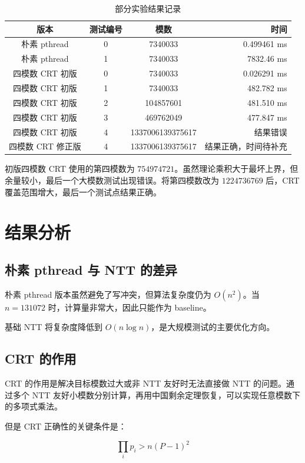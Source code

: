 \documentclass[UTF8,a4paper,12pt]{ctexart}
\begin{document}
\begin{table}[h]
\centering
\begin{tabular}{cccr}
\toprule
版本 & 测试编号 & 模数 & 时间 \\
\midrule
朴素 pthread & 0 & 7340033 & 0.499461 ms \\
朴素 pthread & 1 & 7340033 & 7832.46 ms \\
四模数 CRT 初版 & 0 & 7340033 & 0.026291 ms \\
四模数 CRT 初版 & 1 & 7340033 & 482.782 ms \\
四模数 CRT 初版 & 2 & 104857601 & 481.510 ms \\
四模数 CRT 初版 & 3 & 469762049 & 477.847 ms \\
四模数 CRT 初版 & 4 & 1337006139375617 & 结果错误 \\
四模数 CRT 修正版 & 4 & 1337006139375617 & 结果正确，时间待补充 \\
\bottomrule
\end{tabular}
\caption{部分实验结果记录}
\end{table}

初版四模数 CRT 使用的第四模数为 \(754974721\)。虽然理论乘积大于最坏上界，但余量较小，最后一个大模数测试出现错误。将第四模数改为 \(1224736769\) 后，CRT 覆盖范围增大，最后一个测试点结果正确。

\section{结果分析}

\subsection{朴素 pthread 与 NTT 的差异}

朴素 pthread 版本虽然避免了写冲突，但算法复杂度仍为 \(O(n^2)\)。当 \(n=131072\) 时，计算量非常大，因此只能作为 baseline。

基础 NTT 将复杂度降低到 \(O(n\log n)\)，是大规模测试的主要优化方向。

\subsection{CRT 的作用}

CRT 的作用是解决目标模数过大或非 NTT 友好时无法直接做 NTT 的问题。通过多个 NTT 友好小模数分别计算，再用中国剩余定理恢复，可以实现任意模数下的多项式乘法。

但是 CRT 正确性的关键条件是：

\[
\prod_i p_i > n(P-1)^2
\]
\end{document}
